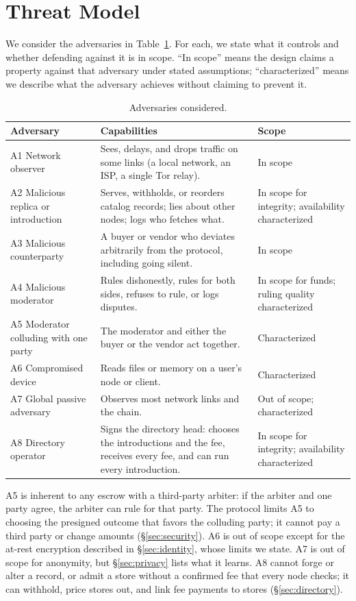 \section{Threat Model}
\label{sec:threats}

We consider the adversaries in Table~\ref{tab:adversaries}. For each, we state what it controls and whether defending against it is in scope. ``In scope'' means the design claims a property against that adversary under stated assumptions; ``characterized'' means we describe what the adversary achieves without claiming to prevent it.

\begin{table}[ht]
\centering\small
\begin{tabularx}{\textwidth}{@{}p{}Xp{}@{}}
\toprule
\textbf{Adversary} & \textbf{Capabilities} & \textbf{Scope} \\
\midrule
A1 Network observer & Sees, delays, and drops traffic on some links (a local network, an ISP, a single Tor relay). & In scope \\
A2 Malicious replica or introduction & Serves, withholds, or reorders catalog records; lies about other nodes; logs who fetches what. & In scope for integrity; availability characterized \\
A3 Malicious counterparty & A buyer or vendor who deviates arbitrarily from the protocol, including going silent. & In scope \\
A4 Malicious moderator & Rules dishonestly, rules for both sides, refuses to rule, or logs disputes. & In scope for funds; ruling quality characterized \\
A5 Moderator colluding with one party & The moderator and either the buyer or the vendor act together. & Characterized \\
A6 Compromised device & Reads files or memory on a user's node or client. & Characterized \\
A7 Global passive adversary & Observes most network links and the chain. & Out of scope; characterized \\
A8 Directory operator & Signs the directory head: chooses the introductions and the fee, receives every fee, and can run every introduction. & In scope for integrity; availability characterized \\
\bottomrule
\end{tabularx}
\caption{Adversaries considered.}
\label{tab:adversaries}
\end{table}

A5 is inherent to any escrow with a third-party arbiter: if the arbiter and one party agree, the arbiter can rule for that party. The protocol limits A5 to choosing the presigned outcome that favors the colluding party; it cannot pay a third party or change amounts (\S\ref{sec:security}). A6 is out of scope except for the at-rest encryption described in \S\ref{sec:identity}, whose limits we state. A7 is out of scope for anonymity, but \S\ref{sec:privacy} lists what it learns. A8 cannot forge or alter a record, or admit a store without a confirmed fee that every node checks; it can withhold, price stores out, and link fee payments to stores (\S\ref{sec:directory}).

